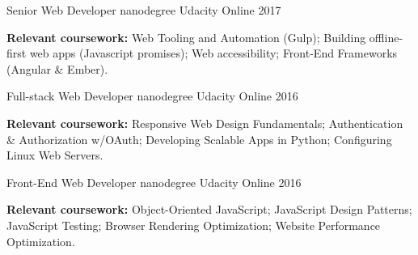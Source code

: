 


\begin{cventries}


\cventry
{Senior Web Developer nanodegree} %
{Udacity} %
{Online} %
{2017} %
{ %
	\begin{cvitems}
		\textbf{Relevant coursework:} \newline
		Web Tooling and Automation (Gulp); Building offline-first web apps (Javascript promises); Web accessibility; Front-End Frameworks (Angular \& Ember).
	\end{cvitems}
}


\cventry
{Full-stack Web Developer nanodegree} %
{Udacity} %
{Online} %
{2016} %
{ %
	\begin{cvitems}
		\textbf{Relevant coursework:} \newline
		Responsive Web Design Fundamentals; Authentication \& Authorization w/OAuth; Developing Scalable Apps in Python; Configuring Linux Web Servers.
	\end{cvitems}
}


\cventry
{Front-End Web Developer nanodegree} %
{Udacity} %
{Online} %
{2016} %
{ %
\begin{cvitems}
	\textbf{Relevant coursework:} \newline
	Object-Oriented JavaScript; JavaScript Design Patterns; JavaScript Testing; Browser Rendering Optimization; Website Performance Optimization.
\end{cvitems}
}


\end{cventries}